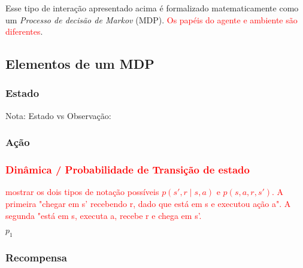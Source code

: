 \documentclass{article}
\begin{document}
        Esse tipo de interação apresentado acima é formalizado matematicamente como um \emph{Processo de decisão de Markov} (MDP). \textcolor{red}{Os papéis do agente e ambiente são diferentes}.
    
        \subsection{Elementos de um MDP}
    
            \subsubsection{Estado}
            
                
                Nota: Estado vs Observação: 
                
            \subsubsection{Ação}
            
                
            \subsubsection{\textcolor{red}{Dinâmica / Probabilidade de Transição de estado}}
            
                \textcolor{red}{mostrar os dois tipos de notação possíveis $p(s', r \mid s, a)$ e $p(s, a, r, s')$. A primeira "chegar em s' recebendo r, dado que está em s e executou ação a". A segunda "está em s, executa a, recebe r e chega em s'.}
        
                $p_1$
                
            \subsubsection{Recompensa}
        
                
\end{document}
